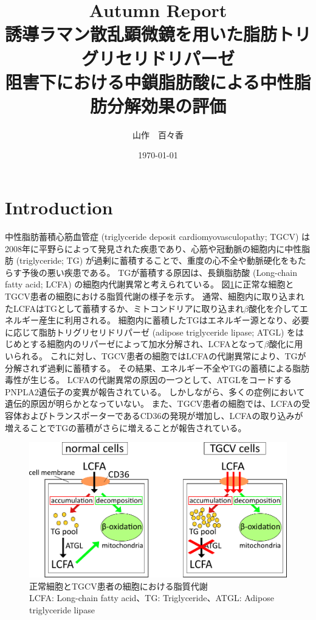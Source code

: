 \documentclass[uplatex,a4paper]{jsarticle}
\begin{document}
\title{Autumn Report\\誘導ラマン散乱顕微鏡を用いた脂肪トリグリセリドリパーゼ\\阻害下における中鎖脂肪酸による中性脂肪分解効果の評価}
\author{山作　百々香}
\date{\today}
\maketitle

\section{Introduction}
中性脂肪蓄積心筋血管症 (triglyceride deposit cardiomyovasculopathy; TGCV)  は2008年に平野らによって発見された疾患であり\cite{Hirano2008}、心筋や冠動脈の細胞内に中性脂肪 (triglyceride; TG) が過剰に蓄積することで、重度の心不全や動脈硬化をもたらす予後の悪い疾患である。
TGが蓄積する原因は、長鎖脂肪酸 (Long-chain fatty acid; LCFA) の細胞内代謝異常と考えられている。
図\ref{fig:normalvsTGCV}に正常な細胞とTGCV患者の細胞における脂質代謝の様子を示す。
通常、細胞内に取り込まれたLCFAはTGとして蓄積するか、ミトコンドリアに取り込まれ$\beta$酸化を介してエネルギー産生に利用される。
細胞内に蓄積したTGはエネルギー源となり、必要に応じて脂肪トリグリセリドリパーゼ (adipose triglyceride lipase; ATGL) をはじめとする細胞内のリパーゼによって加水分解され、LCFAとなって$\beta$酸化に用いられる。
これに対し、TGCV患者の細胞ではLCFAの代謝異常により、TGが分解されず過剰に蓄積する。
その結果、エネルギー不全やTGの蓄積による脂肪毒性が生じる。
LCFAの代謝異常の原因の一つとして、ATGLをコードするPNPLA2遺伝子の変異が報告されている。
しかしながら、多くの症例において遺伝的原因が明らかとなっていない。
また、TGCV患者の細胞では、LCFAの受容体およびトランスポーターであるCD36の発現が増加し、LCFAの取り込みが増えることでTGの蓄積がさらに増えることが報告されている\cite{Hirano2014}。

\begin{figure}[H]
	\centering
	\includegraphics[width=15cm,pagebox=cropbox,clip]{figure/1_1_TGCVcell.pdf}
	\caption{正常細胞とTGCV患者の細胞における脂質代謝\\LCFA: Long-chain fatty acid、TG: Triglyceride、ATGL: Adipose triglyceride lipase \label{fig:normalvsTGCV}}
\end{figure}
\end{document}
